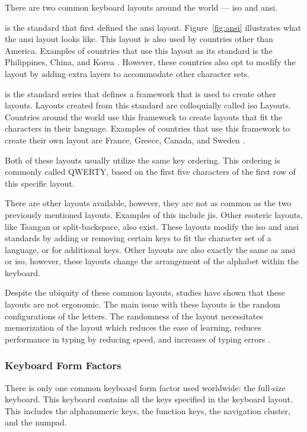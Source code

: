 \documentclass{report}
\begin{document}
There are two common keyboard layouts around the world --- \ac{iso} and \ac{ansi}.

\citeauthor{ansi} is the standard that first defined the \ac{ansi} layout.
Figure~\ref{fig:ansi} illustrates what the \ac{ansi} layout looks like. This layout
is also used by countries other than America. Examples of countries that use
this layout as its standard is the Philippines, China, and Korea
\parencite{apple-layout}. However, these countries also opt to modify the layout
by adding extra layers to accommodate other character sets.

\citeauthor{iso} is the standard series that defines a framework that is used to
create other layouts. Layouts created from this standard are colloquially called
\ac{iso} Layouts. Countries around the world use this framework to create layouts
that fit the characters in their language. Examples of countries that use this
framework to create their own layout are France, Greece, Canada, and Sweden
\parencite{apple-layout}.

Both of these layouts usually utilize the same key ordering. This ordering is
commonly called QWERTY, based on the first five characters of the first row
of this specific layout.

There are other layouts available, however, they are not as common as the two
previously mentioned layouts. Examples of this include \ac{jis}. Other esoteric
layouts, like Tsangan or split-backspace, also exist. These layouts modify the
\ac{iso} and \ac{ansi} standards by adding or removing certain keys to fit the
character set of a language, or for additional keys. Other layouts are also
exactly the same as \ac{ansi} or \ac{iso}, however, these layouts change the
arrangement of the alphabet within the keyboard.

Despite the ubiquity of these common layouts, studies have shown that these
layouts are not ergonomic. The main issue with these layouts is the random
configurations of the letters. The randomness of the layout necessitates
memorization of the layout which reduces the ease of learning, reduces performance
in typing by reducing speed, and increases of typing errors
\parencite{ciobanu2015}.

\subsubsection{Keyboard Form Factors}

There is only one common keyboard form factor used worldwide: the full-size
keyboard. This keyboard contains all the keys specified in the keyboard
layout. This includes the alphanumeric keys, the function keys, the navigation
cluster, and the numpad.
\end{document}
